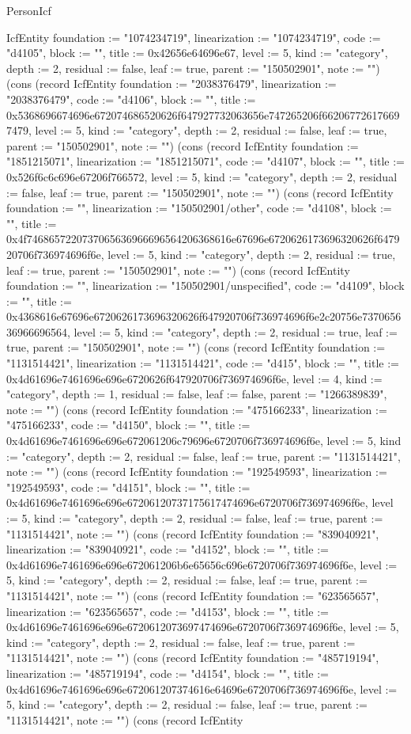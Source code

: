 \begin{lexlean}{PersonIcf}
\begin{semanticmodule}
{IcfEntity {foundation := "1074234719", linearization := "1074234719", code := "d4105", block := "", title := 0x42656e64696e67, level := 5, kind := "category", depth := 2, residual := false, leaf := true, parent := "150502901", note := ""}) (cons (record IcfEntity {foundation := "2038376479", linearization := "2038376479", code := "d4106", block := "", title := 0x5368696674696e672074686520626f647927732063656e747265206f662067726176697479, level := 5, kind := "category", depth := 2, residual := false, leaf := true, parent := "150502901", note := ""}) (cons (record IcfEntity {foundation := "1851215071", linearization := "1851215071", code := "d4107", block := "", title := 0x526f6c6c696e67206f766572, level := 5, kind := "category", depth := 2, residual := false, leaf := true, parent := "150502901", note := ""}) (cons (record IcfEntity {foundation := "", linearization := "150502901/other", code := "d4108", block := "", title := 0x4f7468657220737065636966696564206368616e67696e6720626173696320626f647920706f736974696f6e, level := 5, kind := "category", depth := 2, residual := true, leaf := true, parent := "150502901", note := ""}) (cons (record IcfEntity {foundation := "", linearization := "150502901/unspecified", code := "d4109", block := "", title := 0x4368616e67696e6720626173696320626f647920706f736974696f6e2c20756e737065636966696564, level := 5, kind := "category", depth := 2, residual := true, leaf := true, parent := "150502901", note := ""}) (cons (record IcfEntity {foundation := "1131514421", linearization := "1131514421", code := "d415", block := "", title := 0x4d61696e7461696e696e6720626f647920706f736974696f6e, level := 4, kind := "category", depth := 1, residual := false, leaf := false, parent := "1266389839", note := ""}) (cons (record IcfEntity {foundation := "475166233", linearization := "475166233", code := "d4150", block := "", title := 0x4d61696e7461696e696e672061206c79696e6720706f736974696f6e, level := 5, kind := "category", depth := 2, residual := false, leaf := true, parent := "1131514421", note := ""}) (cons (record IcfEntity {foundation := "192549593", linearization := "192549593", code := "d4151", block := "", title := 0x4d61696e7461696e696e67206120737175617474696e6720706f736974696f6e, level := 5, kind := "category", depth := 2, residual := false, leaf := true, parent := "1131514421", note := ""}) (cons (record IcfEntity {foundation := "839040921", linearization := "839040921", code := "d4152", block := "", title := 0x4d61696e7461696e696e672061206b6e65656c696e6720706f736974696f6e, level := 5, kind := "category", depth := 2, residual := false, leaf := true, parent := "1131514421", note := ""}) (cons (record IcfEntity {foundation := "623565657", linearization := "623565657", code := "d4153", block := "", title := 0x4d61696e7461696e696e6720612073697474696e6720706f736974696f6e, level := 5, kind := "category", depth := 2, residual := false, leaf := true, parent := "1131514421", note := ""}) (cons (record IcfEntity {foundation := "485719194", linearization := "485719194", code := "d4154", block := "", title := 0x4d61696e7461696e696e672061207374616e64696e6720706f736974696f6e, level := 5, kind := "category", depth := 2, residual := false, leaf := true, parent := "1131514421", note := ""}) (cons (record IcfEntity }
\end{semanticmodule}
\end{lexlean}
